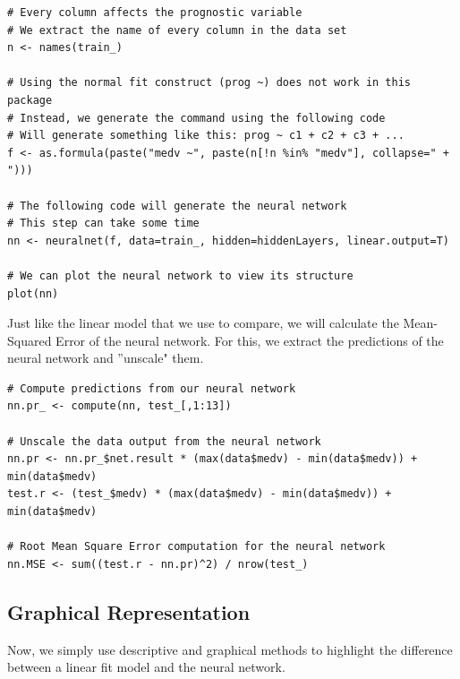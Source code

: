 \begin{lstlisting}
# Every column affects the prognostic variable
# We extract the name of every column in the data set
n <- names(train_)

# Using the normal fit construct (prog ~) does not work in this package
# Instead, we generate the command using the following code
# Will generate something like this: prog ~ c1 + c2 + c3 + ...
f <- as.formula(paste("medv ~", paste(n[!n %in% "medv"], collapse=" + ")))

# The following code will generate the neural network
# This step can take some time
nn <- neuralnet(f, data=train_, hidden=hiddenLayers, linear.output=T)

# We can plot the neural network to view its structure
plot(nn)
\end{lstlisting}

Just like the linear model that we use to compare, we will calculate the Mean-Squared Error of the neural network.
For this, we extract the predictions of the neural network and ''unscale" them. 

\begin{lstlisting}
# Compute predictions from our neural network
nn.pr_ <- compute(nn, test_[,1:13])

# Unscale the data output from the neural network
nn.pr <- nn.pr_$net.result * (max(data$medv) - min(data$medv)) + min(data$medv)
test.r <- (test_$medv) * (max(data$medv) - min(data$medv)) + min(data$medv)

# Root Mean Square Error computation for the neural network
nn.MSE <- sum((test.r - nn.pr)^2) / nrow(test_)
\end{lstlisting}

\subsection{Graphical Representation}

Now, we simply use descriptive and graphical methods to highlight the difference between a linear fit model and the neural network.

